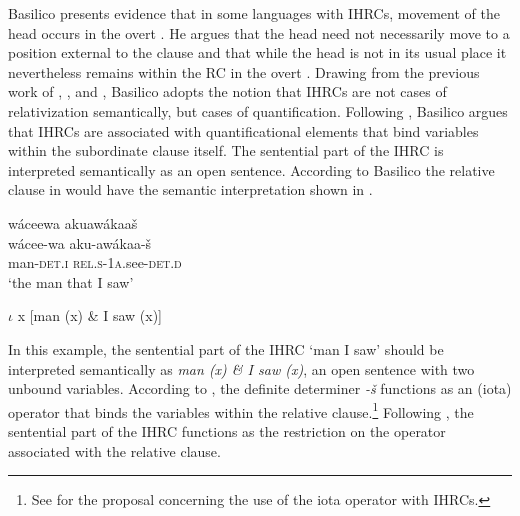 \documentclass[output=paper]{LSP/langsci}
\begin{document}
Basilico presents evidence that in some languages with IHRCs, movement of the head occurs in the overt . He argues that the head need not necessarily move to a position external to the clause and that while the head is not in its usual place it nevertheless remains within the RC in the overt . Drawing from the previous work of \citet{Williamson1987}, \citet{Jelinek1987}, and \citet{Culy1990}, Basilico adopts the notion that IHRCs are not cases of relativization semantically, but cases of quantification. Following \citet{Heim1982}, Basilico argues that IHRCs are associated with quantificational elements that bind variables within the subordinate clause itself. The sentential part of the IHRC is interpreted semantically as an open sentence. According to Basilico the  relative clause in  would have the semantic interpretation shown in .

\ea \label{boyle42}
\glll w\'aceewa     akuaw\'akaa\v{s}\\
w\'acee-wa       aku-aw\'akaa-\v{s}\\
man-\textsc{det.i}  \textsc{rel.s-1a}.see-\textsc{det.d}\\
\trans `the man that I saw'
\z

\ea \label{boyle43}
 $\iota$ x [man (x) \& I saw (x)]  
\z

In this example, the sentential part of the IHRC `man I saw' should be interpreted semantically as \textit{man (x) \& I saw (x)}, an open sentence with two unbound variables.  According to \citeauthor{Basilico1996}, the definite determiner 
\textit{-\v{s}} functions as an (iota) operator that binds the variables within the relative clause.\footnote{See \citet{Jelinek1987} for the proposal concerning the use of the iota operator with IHRCs.} Following \citet{Culy1990}, the sentential part of the IHRC functions as the restriction on the operator associated with the relative clause.  
\end{document}
